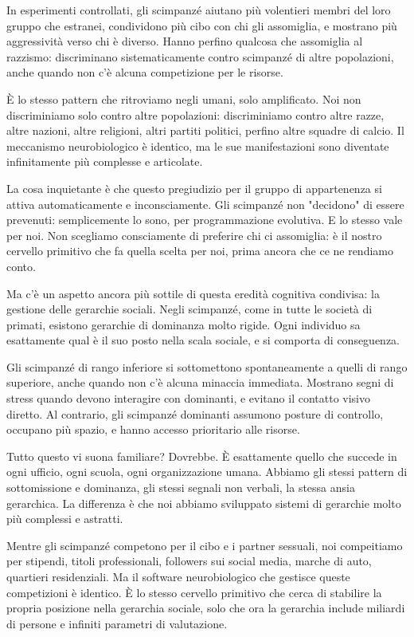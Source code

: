 In esperimenti controllati, gli scimpanzé aiutano più volentieri membri del loro gruppo che estranei, condividono più cibo con chi gli assomiglia, e mostrano più aggressività verso chi è diverso. Hanno perfino qualcosa che assomiglia al razzismo: discriminano sistematicamente contro scimpanzé di altre popolazioni, anche quando non c'è alcuna competizione per le risorse.

È lo stesso pattern che ritroviamo negli umani, solo amplificato. Noi non discriminiamo solo contro altre popolazioni: discriminiamo contro altre razze, altre nazioni, altre religioni, altri partiti politici, perfino altre squadre di calcio. Il meccanismo neurobiologico è identico, ma le sue manifestazioni sono diventate infinitamente più complesse e articolate.

La cosa inquietante è che questo pregiudizio per il gruppo di appartenenza si attiva automaticamente e inconsciamente. Gli scimpanzé non "decidono" di essere prevenuti: semplicemente lo sono, per programmazione evolutiva. E lo stesso vale per noi. Non scegliamo consciamente di preferire chi ci assomiglia: è il nostro cervello primitivo che fa quella scelta per noi, prima ancora che ce ne rendiamo conto.

\medskip

Ma c'è un aspetto ancora più sottile di questa eredità cognitiva condivisa: la gestione delle gerarchie sociali. Negli scimpanzé, come in tutte le società di primati, esistono gerarchie di dominanza molto rigide. Ogni individuo sa esattamente qual è il suo posto nella scala sociale, e si comporta di conseguenza.

Gli scimpanzé di rango inferiore si sottomettono spontaneamente a quelli di rango superiore, anche quando non c'è alcuna minaccia immediata. Mostrano segni di stress quando devono interagire con dominanti, e evitano il contatto visivo diretto. Al contrario, gli scimpanzé dominanti assumono posture di controllo, occupano più spazio, e hanno accesso prioritario alle risorse.

Tutto questo vi suona familiare? Dovrebbe. È esattamente quello che succede in ogni ufficio, ogni scuola, ogni organizzazione umana. Abbiamo gli stessi pattern di sottomissione e dominanza, gli stessi segnali non verbali, la stessa ansia gerarchica. La differenza è che noi abbiamo sviluppato sistemi di gerarchie molto più complessi e astratti.

Mentre gli scimpanzé competono per il cibo e i partner sessuali, noi compeitiamo per stipendi, titoli professionali, followers sui social media, marche di auto, quartieri residenziali. Ma il software neurobiologico che gestisce queste competizioni è identico. È lo stesso cervello primitivo che cerca di stabilire la propria posizione nella gerarchia sociale, solo che ora la gerarchia include miliardi di persone e infiniti parametri di valutazione.

